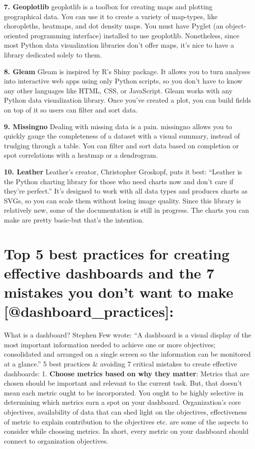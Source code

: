 \documentclass[]{book}
\theoremstyle{definition}
\theoremstyle{definition}
\theoremstyle{definition}
\theoremstyle{remark}
\begin{document}
\textbf{7. Geoplotlib} geoplotlib is a toolbox for creating maps and
plotting geographical data. You can use it to create a variety of
map-types, like choropleths, heatmaps, and dot density maps. You must
have Pyglet (an object-oriented programming interface) installed to use
geoplotlib. Nonetheless, since most Python data visualization libraries
don't offer maps, it's nice to have a library dedicated solely to them.

\textbf{8. Gleam} Gleam is inspired by R's Shiny package. It allows you
to turn analyses into interactive web apps using only Python scripts, so
you don't have to know any other languages like HTML, CSS, or
JavaScript. Gleam works with any Python data visualization library. Once
you've created a plot, you can build fields on top of it so users can
filter and sort data.

\textbf{9. Missingno} Dealing with missing data is a pain. missingno
allows you to quickly gauge the completeness of a dataset with a visual
summary, instead of trudging through a table. You can filter and sort
data based on completion or spot correlations with a heatmap or a
dendrogram.

\textbf{10. Leather} Leather's creator, Christopher Groskopf, puts it
best: ``Leather is the Python charting library for those who need charts
now and don't care if they're perfect.'' It's designed to work with all
data types and produces charts as SVGs, so you can scale them without
losing image quality. Since this library is relatively new, some of the
documentation is still in progress. The charts you can make are pretty
basic-but that's the intention.

\section{Top 5 best practices for creating effective dashboards and the
7 mistakes you don't want to make
{[}@dashboard\_practices{]}:}\label{top-5-best-practices-for-creating-effective-dashboards-and-the-7-mistakes-you-dont-want-to-make-dashboard_practices}

What is a dashboard? Stephen Few wrote: ``A dashboard is a visual
display of the most important information needed to achieve one or more
objectives; consolidated and arranged on a single screen so the
information can be monitored at a glance.'' 5 best practices \& avoiding
7 critical mistakes to create effective dashboards: 1. \textbf{Choose
metrics based on why they matter}: Metrics that are chosen should be
important and relevant to the current task. But, that doesn't mean each
metric ought to be incorporated. You ought to be highly selective in
determining which metrics earn a spot on your dashboard. Organization's
core objectives, availability of data that can shed light on the
objectives, effectiveness of metric to explain contribution to the
objectives etc. are some of the aspects to consider while choosing
metrics. In short, every metric on your dashboard should connect to
organization objectives.
\end{document}
